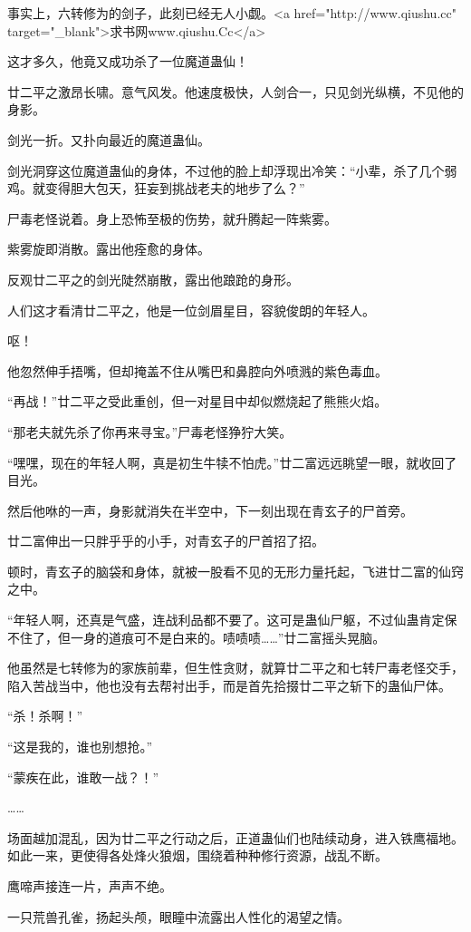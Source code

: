 \begin{this_body}
事实上，六转修为的剑子，此刻已经无人小觑。<a href="http://www.qiushu.cc" target="\_blank">求书网www.qiushu.Cc</a>

这才多久，他竟又成功杀了一位魔道蛊仙！

廿二平之激昂长啸。意气风发。他速度极快，人剑合一，只见剑光纵横，不见他的身影。

剑光一折。又扑向最近的魔道蛊仙。

剑光洞穿这位魔道蛊仙的身体，不过他的脸上却浮现出冷笑：“小辈，杀了几个弱鸡。就变得胆大包天，狂妄到挑战老夫的地步了么？”

尸毒老怪说着。身上恐怖至极的伤势，就升腾起一阵紫雾。

紫雾旋即消散。露出他痊愈的身体。

反观廿二平之的剑光陡然崩散，露出他踉跄的身形。

人们这才看清廿二平之，他是一位剑眉星目，容貌俊朗的年轻人。

呕！

他忽然伸手捂嘴，但却掩盖不住从嘴巴和鼻腔向外喷溅的紫色毒血。

“再战！”廿二平之受此重创，但一对星目中却似燃烧起了熊熊火焰。

“那老夫就先杀了你再来寻宝。”尸毒老怪狰狞大笑。

“嘿嘿，现在的年轻人啊，真是初生牛犊不怕虎。”廿二富远远眺望一眼，就收回了目光。

然后他咻的一声，身影就消失在半空中，下一刻出现在青玄子的尸首旁。

廿二富伸出一只胖乎乎的小手，对青玄子的尸首招了招。

顿时，青玄子的脑袋和身体，就被一股看不见的无形力量托起，飞进廿二富的仙窍之中。

“年轻人啊，还真是气盛，连战利品都不要了。这可是蛊仙尸躯，不过仙蛊肯定保不住了，但一身的道痕可不是白来的。啧啧啧……”廿二富摇头晃脑。

他虽然是七转修为的家族前辈，但生性贪财，就算廿二平之和七转尸毒老怪交手，陷入苦战当中，他也没有去帮衬出手，而是首先拾掇廿二平之斩下的蛊仙尸体。

“杀！杀啊！”

“这是我的，谁也别想抢。”

“蒙疾在此，谁敢一战？！”

……

场面越加混乱，因为廿二平之行动之后，正道蛊仙们也陆续动身，进入铁鹰福地。如此一来，更使得各处烽火狼烟，围绕着种种修行资源，战乱不断。

鹰啼声接连一片，声声不绝。

一只荒兽孔雀，扬起头颅，眼瞳中流露出人性化的渴望之情。


\end{this_body}
